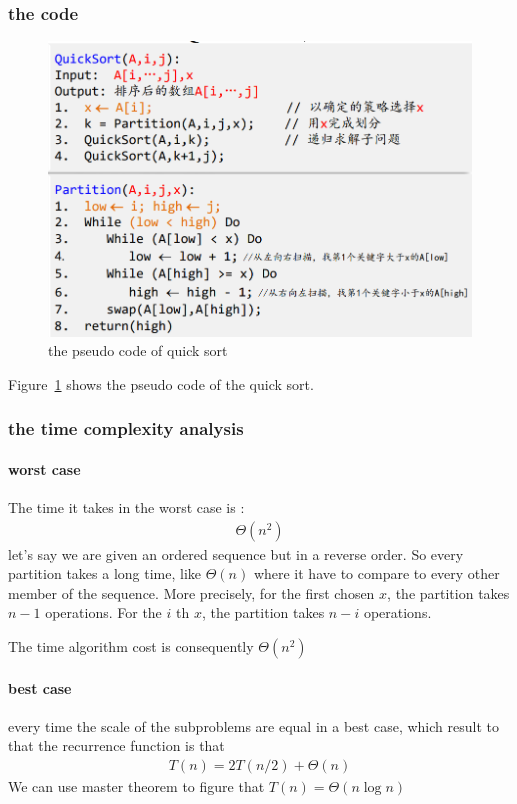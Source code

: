 \documentclass[a4paper, 10pt]{ctexart} %
\begin{document}
\subsubsection{the code}
\begin{figure}[htbp]
    \centering
    \includegraphics[scale = 0.5]{quicksort1.png}
    \caption{the pseudo code of quick sort}
    \label{fig:quicksort1}
\end{figure}
Figure~\ref{fig:quicksort1} shows the pseudo code of the quick sort.
\subsubsection{the time complexity analysis}
\paragraph{worst case}The time it takes in the worst case is :
\begin{align*}
    \Theta \left(n ^{2}\right)
\end{align*}
let's say we are given an ordered sequence but in a reverse order. So every partition takes a 
long time, like $\Theta \left(n\right)$ where it have to compare to every other member of the 
sequence. More precisely, for the first chosen $x$, the partition takes $n-1$ operations. For the $i$ th $x$, the partition 
takes $n - i$ operations. 

The time algorithm cost is consequently $\Theta \left(n^{2}\right)$

\paragraph{best case} %
\label{par:best case}
every time the scale of the subproblems are equal in a best case, which result to that 
the recurrence function is that 
\begin{align*}
    T\left(n \right) =  2 T(n  /2    ) + \Theta \left(n\right)
\end{align*}
We can use master theorem to figure that  $T\left(n\right) = \Theta \left(n \log n\right)$
\end{document}
